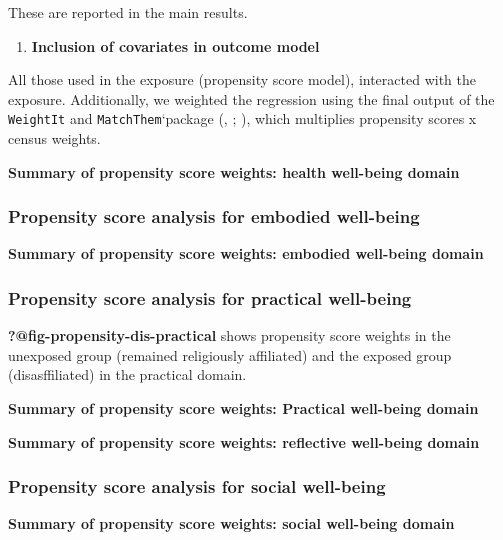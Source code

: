 \documentclass[
  singlecolumn,
  9pt]{scrartcl}
\providecommand{\tightlist}{%
  \setlength{\itemsep}{0pt}\setlength{\parskip}{0pt}}\usepackage{longtable,booktabs,array}
\begin{document}
These are reported in the main results.

\begin{enumerate}
\def\labelenumi{\arabic{enumi}.}
\setcounter{enumi}{10}
\tightlist
\item
  \textbf{Inclusion of covariates in outcome model}
\end{enumerate}

All those used in the exposure (propensity score model), interacted with
the exposure. Additionally, we weighted the regression using the final
output of the \texttt{WeightIt} and \texttt{MatchThem}`package
(,
; ), which multiplies propensity scores x census
weights.

\textbf{Summary of propensity score weights: health well-being domain}

\subsubsection{Propensity score analysis for embodied
well-being}\label{propensity-score-analysis-for-embodied-well-being}

\textbf{Summary of propensity score weights: embodied well-being domain}

\subsubsection{Propensity score analysis for practical
well-being}\label{propensity-score-analysis-for-practical-well-being}

\textbf{?@fig-propensity-dis-practical} shows propensity score weights
in the unexposed group (remained religiously affiliated) and the exposed
group (disasffiliated) in the practical domain.

\textbf{Summary of propensity score weights: Practical well-being
domain}

\textbf{Summary of propensity score weights: reflective well-being
domain}

\subsubsection{Propensity score analysis for social
well-being}\label{propensity-score-analysis-for-social-well-being}

\textbf{Summary of propensity score weights: social well-being domain}
\end{document}
